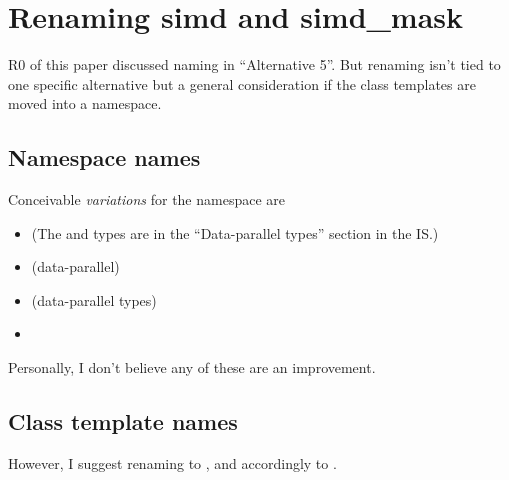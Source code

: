 \section{Renaming simd and simd_mask}\label{sec:naming}
R0 of this paper discussed naming in “Alternative 5”.
But renaming isn't tied to one specific alternative but a general consideration
if the class templates are moved into a namespace.

\subsection{Namespace names}
Conceivable \emph{variations} for the \std{} namespace are
\begin{itemize}
  \item \std{} (The \simd and \mask types are in the “Data-parallel types” section in the IS.)
  \item \std{} (data-parallel)
  \item \std{} (data-parallel types)
  \item \std{}
\end{itemize}
Personally, I don't believe any of these are an improvement.

\subsection{Class template names}
However, I suggest renaming \std{}\MayBreak\mask to
\std{}\MayBreak{}, and accordingly
\std{} to \std{}.

